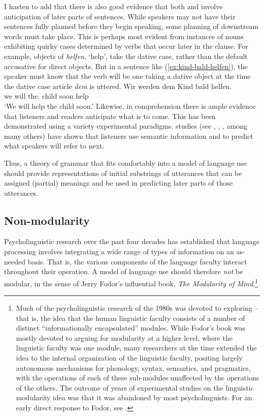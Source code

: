 \documentclass[output=paper
                ,modfonts
                ,nonflat
	        ,collection
	        ,collectionchapter
	        ,collectiontoclongg
 	        ,biblatex
                ,babelshorthands
                ,newtxmath
                ,draftmode
                ,colorlinks, citecolor=brown
]{./langsci/langscibook}
\begin{document}
I hasten to add that there is also good evidence that both  and  involve anticipation of later parts of sentences.  While speakers may not have their sentences fully planned before they begin speaking, some planning of downstream words must take place.  This is perhaps most evident from instances of nouns exhibiting quirky cases determined by verbs that occur later in the clause.  For example, objects of  \emph{helfen}, `help', take the dative case, rather than the default accusative for direct objects.  But in a sentence like (\ref{ex:kind-bald-helfen}), the speaker must know that the verb will be one taking a dative object at the time the dative case article \emph{dem} is uttered.
\ea\label{ex:kind-bald-helfen}
\gll Wir werden dem        Kind bald helfen.\\
     we will    the.\DAT{} child soon help\\\german
\glt `We will help the child soon.'
\z
Likewise, in comprehension there is ample evidence that listeners and readers anticipate what is to come.  This has been demonstrated using a variety experimental paradigms.   studies (see \citealt{TanenhausEtal1995}, \citealt{AltmannKamide99}, \citealt{ArnoldEtal2007}, among many others) have shown that listeners use semantic information and  to predict what speakers will refer to next.

Thus, a theory of grammar that fits comfortably into a model of language use should provide representations of initial substrings of utterances that can be assigned (partial) meanings and be used in predicting later parts of those utterances.

\subsection{Non-modularity}

Psycholinguistic research over the past four decades has established that language processing involves integrating a wide range of types of information on an as-needed basis.  That is, the
various components of the language faculty interact throughout their operation.  A model of language use should therefore \emph{not} be modular, in the sense of Jerry Fodor's influential \citeyearpar{Fodor83a-u} book, \emph{The Modularity of Mind}.\footnote{Much of the psycholinguistic research of the 1980s was devoted to exploring  -- that is, the idea that the human linguistic faculty consists of a number of distinct ``informationally encapsulated'' modules.  While Fodor's book was mostly devoted to arguing for modularity at a higher level, where the linguistic faculty was one module, many researchers at the time extended the idea to the internal organization of the linguistic faculty, positing largely autonomous mechanisms for phonology, syntax, semantics, and pragmatics, with the operations of each of these sub-modules unaffected by the operations of the others. The outcome of years of experimental studies on the linguistic modularity idea was that it was abandoned by most psycholinguists. For an early direct response to Fodor, see \citet{MarslenTyler87}.}
\end{document}

